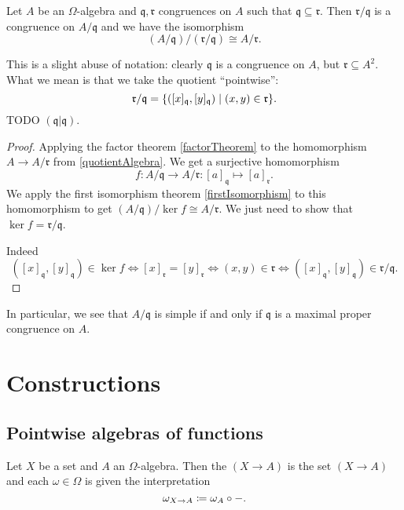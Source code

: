 \begin{theorem}
Let $A$ be an $\Omega$-algebra and $\mathfrak{q},\mathfrak{r}$ congruences on $A$ such that $\mathfrak{q} \subseteq \mathfrak{r}$. Then $\mathfrak{r}/\mathfrak{q}$ is a congruence on $A/\mathfrak{q}$ and we have the isomorphism
\[ (A/\mathfrak{q})/(\mathfrak{r}/\mathfrak{q}) \cong A/\mathfrak{r}. \]
\end{theorem}
This is a slight abuse of notation: clearly $\mathfrak{q}$ is a congruence on $A$, but $\mathfrak{r}\subseteq A^2$. What we mean is that we take the quotient ``pointwise'':
\[ \mathfrak{r}/\mathfrak{q} = \setbuilder{([x]_\mathfrak{q}, [y]_\mathfrak{q})}{(x,y)\in \mathfrak{r}}. \]
TODO $(\mathfrak{q}|\mathfrak{q})$.
\begin{proof}
Applying the factor theorem \ref{factorTheorem} to the homomorphism $A\to A/\mathfrak{r}$ from \ref{quotientAlgebra}. We get a surjective homomorphism
\[ f: A/\mathfrak{q} \to A/\mathfrak{r}: [a]_\mathfrak{q} \mapsto [a]_{\mathfrak{r}}. \]
We apply the first isomorphism theorem \ref{firstIsomorphism} to this homomorphism to get $(A/\mathfrak{q})/\ker f \cong A/\mathfrak{r}$. We just need to show that $\ker f = \mathfrak{r}/\mathfrak{q}$.

Indeed
\[ ([x]_\mathfrak{q},[y]_\mathfrak{q}) \in \ker f \iff [x]_\mathfrak{r} = [y]_\mathfrak{r} \iff (x, y)\in \mathfrak{r} \iff ([x]_\mathfrak{q},[y]_\mathfrak{q}) \in \mathfrak{r}/\mathfrak{q}. \]
\end{proof}
In particular, we see that $A/\mathfrak{q}$ is simple if and only if $\mathfrak{q}$ is a maximal proper congruence on $A$.

\section{Constructions}
\subsection{Pointwise algebras of functions}
\begin{definition}
Let $X$ be a set and $A$ an $\Omega$-algebra. Then the  $(X\to A)$ is the set $(X\to A)$ and each $\omega\in\Omega$ is given the interpretation
\[ \omega_{X\to A} \coloneqq \omega_A\circ -.  \]
\end{definition}

